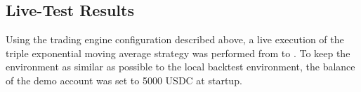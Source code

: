 \subsection{Live-Test Results}

Using the trading engine configuration described above, a live execution of the triple exponential moving average strategy was performed from \liveStartDataStartDate to \liveStartDataEndDate.
To keep the environment as similar as possible to the local backtest environment, the balance of the demo account was set to 5000 USDC at startup.